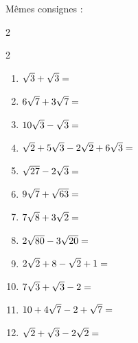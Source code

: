 \documentclass[main.tex]{subfiles}
\begin{document}
\begin{exercise}[\cancel{\faCalculator}] \label{chap08:exo:radicaux:reduire} Mêmes consignes :\hfill \vspace{-0.5em}  
	\begin{multicols}{2}\begin{spacing}{2}
		\begin{enumerate}[label={},leftmargin=*]  
			\item $\sqrt{3}+\sqrt{3}=\dotfill$
			\item $6\sqrt{7}+3\sqrt{7}=\dotfill$
			\item $10\sqrt{3}-\sqrt{3}=\dotfill$
			\item $\sqrt{2}+5\sqrt{3}-2\sqrt{2}+6\sqrt{3}=\dotfill$
			\item $\sqrt{27}-2\sqrt{3}=\dotfill$ 
			\item $9\sqrt{7}+\sqrt{63}=\dotfill$  
			\item $7\sqrt{8}+3\sqrt{2}=\dotfill$
			\item $2\sqrt{80}-3\sqrt{20}=\dotfill$
			\item $2\sqrt{2}+8-\sqrt{2}+1=\dotfill$
			\item $7\sqrt{3}+\sqrt{3}-2=\dotfill$
			\item $10+4\sqrt{7}-2+\sqrt{7}=\dotfill$
			\item $\sqrt{2}+\sqrt{3}-2\sqrt{2}=\dotfill$ 
		\end{enumerate}\end{spacing}
	\end{multicols}
\end{exercise}
\end{document}
